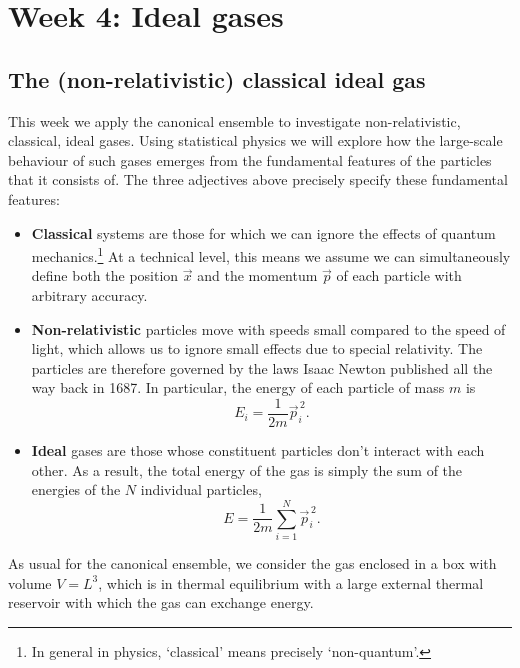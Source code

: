 \renewcommand{\thisweek}{MATH327 Week 4}
\renewcommand{\moddate}{Last modified 31 Jan.~2021}
\setcounter{section}{4}
\setcounter{subsection}{0}
{}
\section*{Week 4: Ideal gases}

\subsection{The (non-relativistic) classical ideal gas}
This week we apply the canonical ensemble to investigate non-relativistic, classical, ideal gases.
Using statistical physics we will explore how the large-scale behaviour of such gases emerges from the fundamental features of the particles that it consists of.
The three adjectives above precisely specify these fundamental features: \\[-24 pt]
\begin{itemize}
  \item \textbf{Classical} systems are those for which we can ignore the effects of quantum mechanics.\footnote{In general in physics, `classical' means precisely `non-quantum'.}
        At a technical level, this means we assume we can simultaneously define both the position $\vec x$ and the momentum $\vec p$ of each particle with arbitrary accuracy.
  \item \textbf{Non-relativistic} particles move with speeds small compared to the speed of light, which allows us to ignore small effects due to special relativity.
        The particles are therefore governed by the laws Isaac Newton published all the way back in 1687.
        In particular, the energy of each particle of mass $m$ is
        \begin{equation*}
          E_i = \frac{1}{2m} \vec{p}_i^{\,2}.
        \end{equation*}
  \item \textbf{Ideal} gases are those whose constituent particles don't interact with each other.
        As a result, the total energy of the gas is simply the sum of the energies of the $N$ individual particles,
        \begin{equation}
          E = \frac{1}{2m} \sum_{i = 1}^N \vec{p}_i^{\,2}.
        \end{equation}
\end{itemize}

As usual for the canonical ensemble, we consider the gas enclosed in a box with volume $V = L^3$, which is in thermal equilibrium with a large external thermal reservoir with which the gas can exchange energy.



